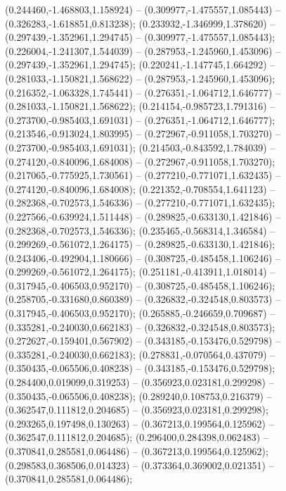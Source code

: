  (0.244460,-1.468803,1.158924) -- (0.309977,-1.475557,1.085443) -- (0.326283,-1.618851,0.813238);
 (0.233932,-1.346999,1.378620) -- (0.297439,-1.352961,1.294745) -- (0.309977,-1.475557,1.085443);
 (0.226004,-1.241307,1.544039) -- (0.287953,-1.245960,1.453096) -- (0.297439,-1.352961,1.294745);
 (0.220241,-1.147745,1.664292) -- (0.281033,-1.150821,1.568622) -- (0.287953,-1.245960,1.453096);
 (0.216352,-1.063328,1.745441) -- (0.276351,-1.064712,1.646777) -- (0.281033,-1.150821,1.568622);
 (0.214154,-0.985723,1.791316) -- (0.273700,-0.985403,1.691031) -- (0.276351,-1.064712,1.646777);
 (0.213546,-0.913024,1.803995) -- (0.272967,-0.911058,1.703270) -- (0.273700,-0.985403,1.691031);
 (0.214503,-0.843592,1.784039) -- (0.274120,-0.840096,1.684008) -- (0.272967,-0.911058,1.703270);
 (0.217065,-0.775925,1.730561) -- (0.277210,-0.771071,1.632435) -- (0.274120,-0.840096,1.684008);
 (0.221352,-0.708554,1.641123) -- (0.282368,-0.702573,1.546336) -- (0.277210,-0.771071,1.632435);
 (0.227566,-0.639924,1.511448) -- (0.289825,-0.633130,1.421846) -- (0.282368,-0.702573,1.546336);
 (0.235465,-0.568314,1.346584) -- (0.299269,-0.561072,1.264175) -- (0.289825,-0.633130,1.421846);
 (0.243406,-0.492904,1.180666) -- (0.308725,-0.485458,1.106246) -- (0.299269,-0.561072,1.264175);
 (0.251181,-0.413911,1.018014) -- (0.317945,-0.406503,0.952170) -- (0.308725,-0.485458,1.106246);
 (0.258705,-0.331680,0.860389) -- (0.326832,-0.324548,0.803573) -- (0.317945,-0.406503,0.952170);
 (0.265885,-0.246659,0.709687) -- (0.335281,-0.240030,0.662183) -- (0.326832,-0.324548,0.803573);
 (0.272627,-0.159401,0.567902) -- (0.343185,-0.153476,0.529798) -- (0.335281,-0.240030,0.662183);
 (0.278831,-0.070564,0.437079) -- (0.350435,-0.065506,0.408238) -- (0.343185,-0.153476,0.529798);
 (0.284400,0.019099,0.319253) -- (0.356923,0.023181,0.299298) -- (0.350435,-0.065506,0.408238);
 (0.289240,0.108753,0.216379) -- (0.362547,0.111812,0.204685) -- (0.356923,0.023181,0.299298);
 (0.293265,0.197498,0.130263) -- (0.367213,0.199564,0.125962) -- (0.362547,0.111812,0.204685);
 (0.296400,0.284398,0.062483) -- (0.370841,0.285581,0.064486) -- (0.367213,0.199564,0.125962);
 (0.298583,0.368506,0.014323) -- (0.373364,0.369002,0.021351) -- (0.370841,0.285581,0.064486);
